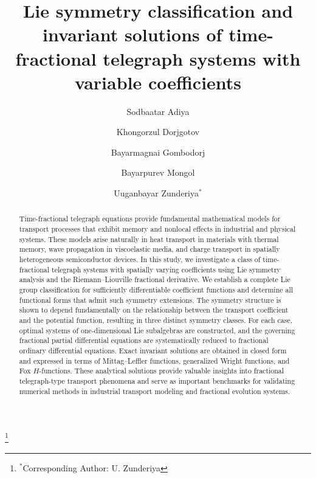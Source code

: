 \documentclass[12pt]{amsart}
\begin{document}

\title{Lie symmetry classification and invariant solutions of time-fractional telegraph systems with variable coefficients}

\author[Sodoo]{Sodbaatar Adiya}
\address{National Intelligence University and Department of Mathematics, National University of Mongolia, Ulaanbaatar, Mongolia}
\author[khongoroo]{Khongorzul Dorjgotov}
\address{Department of Mathematics, National University of Mongolia, Ulaanbaatar, Mongolia}
\author[magnai]{Bayarmagnai Gombodorj}
\address{Department of Mathematics, National University of Mongolia, Ulaanbaatar, Mongolia}
\author[bayaraa]{Bayarpurev Mongol}
\address{Department of Electronics and Communication Engineering, National University of Mongolia, Ulaanbaatar, Mongolia}
\author[uuganaa]{Uuganbayar Zunderiya$^*$}
\address{Department of Mathematics, National University of Mongolia, Ulaanbaatar, Mongolia}

\thanks{$^*$Corresponding Author: U. Zunderiya}



\begin{abstract}
Time-fractional telegraph equations provide fundamental mathematical models for transport processes that exhibit memory and nonlocal effects in industrial and physical systems. These models arise naturally in heat transport in materials with thermal memory, wave propagation in viscoelastic media, and charge transport in spatially heterogeneous semiconductor devices. In this study, we investigate a class of time-fractional telegraph systems with spatially varying coefficients using Lie symmetry analysis and the Riemann--Liouville fractional derivative. We establish a complete Lie group classification for sufficiently differentiable coefficient functions and determine all functional forms that admit such symmetry extensions. The symmetry structure is shown to depend fundamentally on the relationship between the transport coefficient and the potential function, resulting in three distinct symmetry classes. For each case, optimal systems of one-dimensional Lie subalgebras are constructed, and the governing fractional partial differential equations are systematically reduced to fractional ordinary differential equations. Exact invariant solutions are obtained in closed form and expressed in terms of Mittag--Leffler functions, generalized Wright functions, and Fox $H$-functions. These analytical solutions provide valuable insights into fractional telegraph-type transport phenomena and serve as important benchmarks for validating numerical methods in industrial transport modeling and fractional evolution systems.
\end{abstract}
\end{document}
